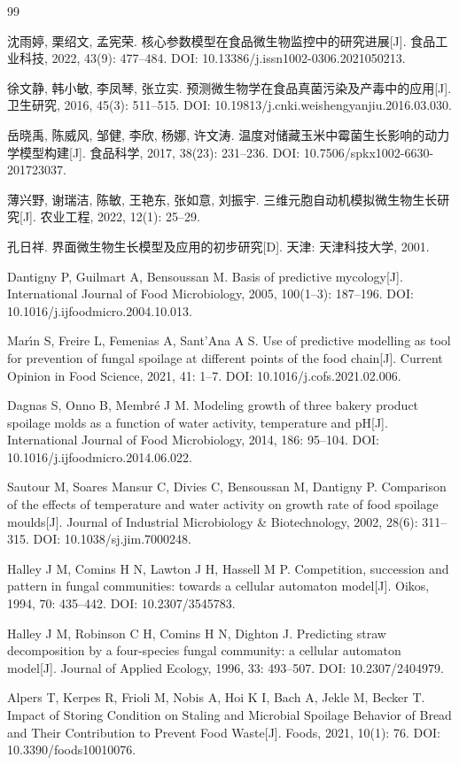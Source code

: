\documentclass[12pt,a4paper]{ctexart}
\begin{document}
\begin{thebibliography}{99}

沈雨婷, 栗绍文, 孟宪荣.
核心参数模型在食品微生物监控中的研究进展[J].
食品工业科技, 2022, 43(9): 477--484.
DOI: 10.13386/j.issn1002-0306.2021050213.

徐文静, 韩小敏, 李凤琴, 张立实.
预测微生物学在食品真菌污染及产毒中的应用[J].
卫生研究, 2016, 45(3): 511--515.
DOI: 10.19813/j.cnki.weishengyanjiu.2016.03.030.

岳晓禹, 陈威风, 邹健, 李欣, 杨娜, 许文涛.
温度对储藏玉米中霉菌生长影响的动力学模型构建[J].
食品科学, 2017, 38(23): 231--236.
DOI: 10.7506/spkx1002-6630-201723037.

薄兴野, 谢瑞洁, 陈敏, 王艳东, 张如意, 刘振宇.
三维元胞自动机模拟微生物生长研究[J].
农业工程, 2022, 12(1): 25--29.

孔日祥.
界面微生物生长模型及应用的初步研究[D].
天津: 天津科技大学, 2001.

Dantigny P, Guilmart A, Bensoussan M.
Basis of predictive mycology[J].
International Journal of Food Microbiology, 2005, 100(1--3): 187--196.
DOI: 10.1016/j.ijfoodmicro.2004.10.013.

Mar{\'\i}n S, Freire L, Femenias A, Sant'Ana A S.
Use of predictive modelling as tool for prevention of fungal spoilage at different points of the food chain[J].
Current Opinion in Food Science, 2021, 41: 1--7.
DOI: 10.1016/j.cofs.2021.02.006.

Dagnas S, Onno B, Membr{\'e} J M.
Modeling growth of three bakery product spoilage molds as a function of water activity, temperature and pH[J].
International Journal of Food Microbiology, 2014, 186: 95--104.
DOI: 10.1016/j.ijfoodmicro.2014.06.022.

Sautour M, Soares Mansur C, Divies C, Bensoussan M, Dantigny P.
Comparison of the effects of temperature and water activity on growth rate of food spoilage moulds[J].
Journal of Industrial Microbiology \& Biotechnology, 2002, 28(6): 311--315.
DOI: 10.1038/sj.jim.7000248.

Halley J M, Comins H N, Lawton J H, Hassell M P.
Competition, succession and pattern in fungal communities: towards a cellular automaton model[J].
Oikos, 1994, 70: 435--442.
DOI: 10.2307/3545783.

Halley J M, Robinson C H, Comins H N, Dighton J.
Predicting straw decomposition by a four-species fungal community: a cellular automaton model[J].
Journal of Applied Ecology, 1996, 33: 493--507.
DOI: 10.2307/2404979.

Alpers T, Kerpes R, Frioli M, Nobis A, Hoi K I, Bach A, Jekle M, Becker T.
Impact of Storing Condition on Staling and Microbial Spoilage Behavior of Bread and Their Contribution to Prevent Food Waste[J].
Foods, 2021, 10(1): 76.
DOI: 10.3390/foods10010076.

\end{thebibliography}
\end{document}
